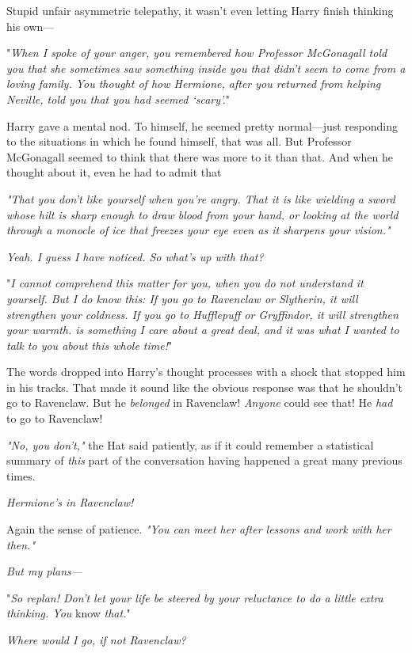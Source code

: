 Stupid unfair asymmetric telepathy, it wasn't even letting Harry finish
thinking his own---

"\emph{When I spoke of your anger, you remembered how Professor McGonagall told
you that she sometimes saw something inside you that didn't seem to come from a
loving family. You thought of how Hermione, after you returned from helping
Neville, told you that you had seemed `scary'.}"

Harry gave a mental nod. To himself, he seemed pretty normal---just responding
to the situations in which he found himself, that was all. But Professor
McGonagall seemed to think that there was more to it than that. And when he
thought about it, even he had to admit that{\el}

\emph{"That you don't like yourself when you're angry. That it is like wielding
a sword whose hilt is sharp enough to draw blood from your hand, or looking at
the world through a monocle of ice that freezes your eye even as it sharpens
your vision."}

\emph{Yeah. I guess I have noticed. So what's up with that?}

"\emph{I cannot comprehend this matter for you, when you do not understand it
yourself. But I do know this: If you go to Ravenclaw or Slytherin, it will
strengthen your coldness. If you go to Hufflepuff or Gryffindor, it will
strengthen your warmth.  is something I care about a great deal, and it was
what I wanted to talk to you about this whole time!}"

The words dropped into Harry's thought processes with a shock that stopped him
in his tracks. That made it sound like the obvious response was that he
shouldn't go to Ravenclaw. But he \emph{belonged} in Ravenclaw! \emph{Anyone}
could see that! He \emph{had} to go to Ravenclaw!

\emph{"No, you don't,"} the Hat said patiently, as if it could remember a
statistical summary of \emph{this} part of the conversation having happened a
great many previous times.

\emph{Hermione's in Ravenclaw!}

Again the sense of patience. \emph{"You can meet her after lessons and work
with her then."}

\emph{But my plans---}

"\emph{So replan! Don't let your life be steered by your reluctance to do a
little extra thinking. You} know \emph{that.}"

\emph{Where would I go, if not Ravenclaw?}

